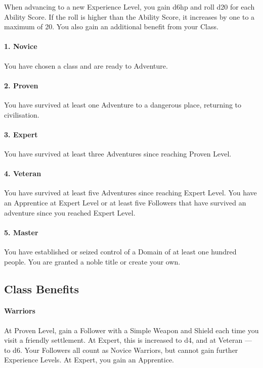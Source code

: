 \documentclass[itdr]{subfiles}
\begin{document}
When advancing to a new Experience Level, you gain d6hp and roll d20 for each Ability Score. If the roll is higher than the Ability Score, it increases by one to a maximum of 20. You also gain an additional benefit from your Class.

\paragraph{1. Novice}
You have chosen a class and are ready to Adventure.

\paragraph{2. Proven}
You have survived at least one Adventure to a dangerous place, returning to civilisation.

\paragraph{3. Expert}
You have survived at least three Adventures since reaching Proven Level.

\paragraph{4. Veteran}
You have survived at least five Adventures since reaching Expert Level. You have an Apprentice at Expert Level or at least five Followers that have survived an adventure since you reached Expert Level.

\paragraph{5. Master}

You have established or seized control of a Domain of at least one hundred people. You are granted a noble title or create your own.

\vfill
\break

\subsection{Class Benefits}

\paragraph{Warriors}
At Proven Level, gain a Follower with a Simple Weapon and Shield each time you visit a friendly settlement. At Expert, this is increased to d4, and at Veteran --- to d6. Your Followers all count as Novice Warriors, but cannot gain further Experience Levels. At Expert, you gain an Apprentice.
\end{document}
